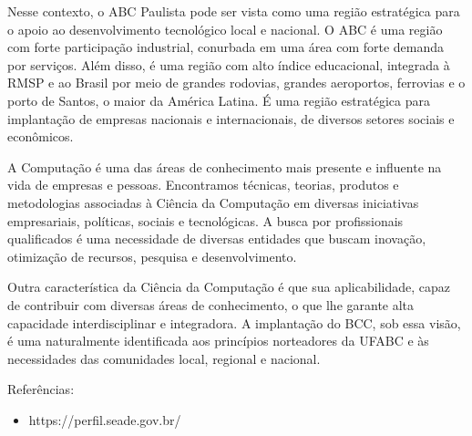 Nesse contexto, o ABC Paulista pode ser vista como uma região estratégica para o apoio ao desenvolvimento tecnológico local e nacional. O ABC é uma região com forte participação industrial, conurbada em uma área com forte demanda por serviços. Além disso, é uma região com alto índice educacional, integrada à RMSP e ao Brasil por meio de grandes rodovias, grandes aeroportos, ferrovias e o porto de Santos, o maior da América Latina. É uma região estratégica para implantação de empresas nacionais e internacionais, de diversos setores sociais e econômicos.

A Computação é uma das áreas de conhecimento mais presente e influente na vida de empresas e pessoas. Encontramos técnicas, teorias, produtos e metodologias associadas à Ciência da Computação em diversas iniciativas empresariais, políticas, sociais e tecnológicas. A busca por profissionais qualificados é uma necessidade de diversas entidades que buscam inovação, otimização de recursos, pesquisa e desenvolvimento.

Outra característica da Ciência da Computação é que sua aplicabilidade, capaz de contribuir com diversas áreas de conhecimento, o que lhe garante alta capacidade interdisciplinar e integradora. A implantação do BCC, sob essa visão, é uma naturalmente identificada aos princípios norteadores da UFABC e às necessidades das comunidades local, regional e nacional.


Referências:

\begin{itemize}
	\item https://perfil.seade.gov.br/
\end{itemize}
